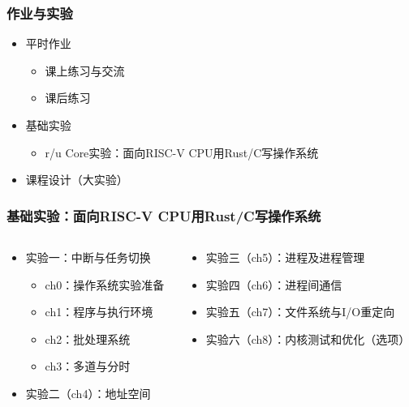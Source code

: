     \begin{frame}
        \frametitle{作业与实验}
        \begin{itemize}
            \item 平时作业
        \begin{itemize}
    		\item 课上练习与交流
	    	\item 课后练习
        \end{itemize} %

            \item 基础实验
    \begin{itemize}
		\item r/u Core实验：面向RISC-V CPU用Rust/C写操作系统
    \end{itemize}
            \item 课程设计（大实验）
        \end{itemize}
\end{frame}

\begin{frame}
\frametitle{基础实验：面向RISC-V CPU用Rust/C写操作系统}
\begin{columns}
	
\begin{column}{0.4\textwidth}
\begin{itemize}
        \item 实验一：中断与任务切换
        \begin{itemize}
                \item ch0：操作系统实验准备
                \item ch1：程序与执行环境
                \item ch2：批处理系统
                \item ch3：多道与分时
        \end{itemize}

        \item 实验二（ch4）：地址空间
\end{itemize}

\end{column}
 
\begin{column}{0.6\textwidth}
    \begin{itemize}
                \item 实验三（ch5）：进程及进程管理
                \item 实验四（ch6）：进程间通信
                \item 实验五（ch7）：文件系统与I/O重定向
                \item 实验六（ch8）：内核测试和优化（选项）
        \end{itemize}
\end{column}

\end{columns}

\end{frame}



